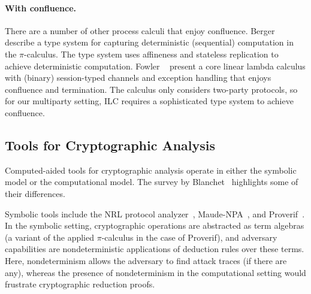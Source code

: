 
\paragraph{With confluence.}
There are a number of other process calculi that enjoy confluence.  Berger
\etal~\cite{berger2001sequentiality} describe a type system for capturing
deterministic (sequential) computation in the $\pi$-calculus. The type system uses
affineness and stateless replication to achieve deterministic computation.
Fowler \etal~\cite{fowler2018session} present a core linear lambda calculus with
(binary) session-typed channels and exception handling that enjoys confluence
and termination.
The calculus only considers two-party protocols, so for our multiparty setting,
ILC requires a sophisticated type system to achieve confluence.

\subsection{Tools for Cryptographic Analysis}
\label{subsec:tools}
Computed-aided tools for cryptographic analysis operate in either the symbolic
model or the computational model. The survey by
Blanchet~\cite{blanchet2012security} highlights some of their differences.


Symbolic tools include the NRL protocol analyzer~\cite{meadows1996nrl},
Maude-NPA~\cite{escobar2009maude}, and Proverif~\cite{blanchet2010proverif}. In
the symbolic setting, cryptographic operations are abstracted as term algebras
(a variant of the applied $\pi$-calculus in the case of Proverif), and adversary
capabilities are nondeterministic applications of deduction rules over these
terms. Here, nondeterminism allows the adversary to find attack traces (if there
are any), whereas the presence of nondeterminism in the computational setting
would frustrate cryptographic reduction proofs.

